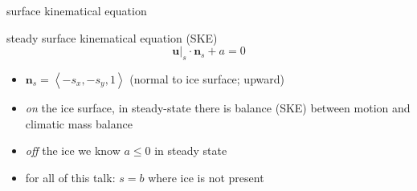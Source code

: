 \documentclass{beamer}
\newcommand{\bn}{\mathbf{n}}
\newcommand{\bu}{\mathbf{u}}
\begin{document}
\begin{frame}{surface kinematical equation}

\begin{block}{steady surface kinematical equation (SKE)}
$$\bu|_s \cdot \bn_s + a=0$$
\end{block}

\begin{itemize}
\item $\bn_s = \left<-s_x,-s_y,1\right>$  \quad (normal to ice surface; upward)
\item \emph{on} the ice surface, in steady-state there is balance (SKE) between motion and climatic mass balance
\item \emph{off} the ice we know $a\le 0$ in steady state
\item for all of this talk: $s=b$ where ice is not present
\end{itemize}
\end{frame}
\end{document}
